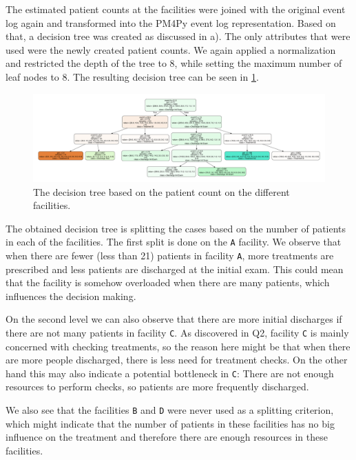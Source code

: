 \documentclass[12pt]{report}
\begin{document}
The estimated patient counts at the facilities were joined with the original event log again and transformed into the PM4Py event log representation. Based on that, a decision tree was created as discussed in a). The only attributes that were used were the newly created patient counts. We again applied a normalization and restricted the depth of the tree to 8, while setting the maximum number of leaf nodes to 8. The resulting decision tree can be seen in \ref{fig:figures-q4-facility-tree-png}.

\begin{figure}[h]
    \centering
    \includegraphics[width=\textwidth]{figures/q4_facility_tree.pdf}
    \caption{The decision tree based on the patient count on the different facilities.}
    \label{fig:figures-q4-facility-tree-png}
\end{figure}

The obtained decision tree is splitting the cases based on the number of patients in each of the facilities. The first split is done on the \texttt{A} facility. We observe that when there are fewer (less than 21) patients in facility \texttt{A}, more treatments are prescribed and less patients are discharged at the initial exam. This could mean that the facility is somehow overloaded when there are many patients, which influences the decision making. 

On the second level we can also observe that there are more initial discharges if there are not many patients in facility \texttt{C}. As discovered in Q2, facility \texttt{C} is mainly concerned with checking treatments, so the reason here might be that when there are more people discharged, there is less need for treatment checks. On the other hand this may also indicate a potential bottleneck in \texttt{C}: There are not enough resources to perform checks, so patients are more frequently discharged.

We also see that the facilities \texttt{B} and \texttt{D} were never used as a splitting criterion, which might indicate that the number of patients in these facilities has no big influence on the treatment and therefore there are enough resources in these facilities.
\end{document}
